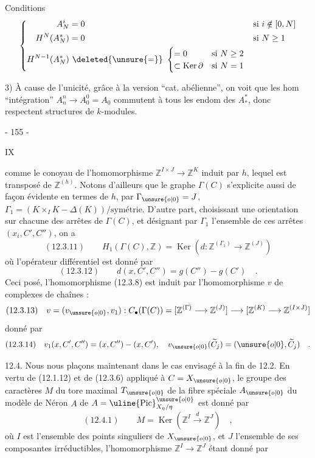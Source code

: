 Conditions 
\[
\left\{
\begin{aligned}
A_N^i&=0&&\text{si }i\notin[0,N]\\
H^N(A_N^*)&=0&&\text{si }N\geq1\\
H^{N-1}(A_N^*)&\ \deleted{\unsure{=}}\ 
\begin{cases}
=0&\text{si }N\geq2\\
\subset\operatorname{Ker}\partial&\text{si }N=1
\end{cases}
\end{aligned}
\right.
\]

3) À cause de l'unicité,  grâce à la version ``cat. abélienne'', on voit que les hom ``intégration''
$A_n^n\longrightarrow A_0^0=A_0$ commutent à tous les endom des $A_*^*$, donc respectent  structures de $k$-modules.



\begin{center}- 155 -\end{center}
\begin{flushright}IX\end{flushright}

comme le conoyau de l'homomorphisme $\mathbb Z^{I\times J}\longrightarrow\mathbb Z^K$ induit par $h$, lequel est transposé de $\mathbb Z^{(h)}$. Notons d'ailleurs que le graphe $\Gamma(C)$ s'explicite aussi de façon évidente en termes de $h$, par $\Gamma_{\unsure{o|0}}=J$, $\Gamma_1=(K\times_I K-\Delta(K))/\text{symétrie}$. D'autre part, choisissant une orientation sur chacune des arrêtes de $\Gamma(C)$, et désignant par $\Gamma_1$ l'ensemble de ces arrêtes $(x_i,C',C'')$, on a
\[
(12.3.11)\qquad
H_1(\Gamma(C),\mathbb Z)=\operatorname{Ker}(d:\mathbb Z^{(\Gamma_1)}\longrightarrow\mathbb Z^{(J)})
\]
où l'opérateur différentiel est donné par
\[
(12.3.12)\qquad d(x,C',C'')=g(C'')-g(C')\quad.
\]
Ceci posé, l'homomorphisme (12.3.8) est induit par l'homomorphisme $v$ de complexes de chaînes :
\[
(12.3.13)\quad
v=(v_{\unsure{o|0}},v_1):C_{\bullet}(\Gamma(C))
=[\mathbb Z^{(\Gamma)}\longrightarrow\mathbb Z^{(J)}]
\longrightarrow[\mathbb Z^{(K)}\longrightarrow\mathbb Z^{(I\times J)}]
\]
donné par
\[
(12.3.14)\quad
v_1(x,C',C'')=(x,C'')-(x,C'),\quad
v_{\unsure{o|0}}(\widetilde C_j)=(\unsure{o|0},\widetilde C_j)\quad.
\]

12.4. Nous nous plaçons maintenant dans le cas envisagé à la fin de 12.2. En vertu de (12.1.12) et de (12.3.6) appliqué à $C=X_{\unsure{o|0}}$, le groupe des caractères $M$ du tore maximal $T_{\unsure{o|0}}$ de la fibre spéciale $A_{\unsure{o|0}}$ du modèle de Néron $A$ de $A=\uline{\operatorname{Pic}}^{\unsure{o|0}}_{X_\eta/\eta}$ est donné par
\[
(12.4.1)\qquad M=\operatorname{Ker}(\mathbb Z^I\xrightarrow{d}\mathbb Z^J)\quad,
\]
où $I$ est l'ensemble des points singuliers de $X_{\unsure{o|0}}$, et $J$ l'ensemble de ses composantes irréductibles, l'homomorphisme $\mathbb Z^I\longrightarrow\mathbb Z^J$ étant donné par

